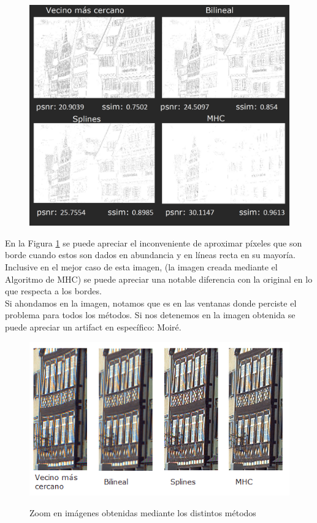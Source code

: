 \documentclass[a4paper]{article}
\begin{document}
\begin{figure}[h!]
    \caption{}
    \begin{center}
    \includegraphics[scale=0.40]{imagenes/comparacion/04/collage}
    \label{imagen4}
  \end{center}
\end{figure}

En la Figura \ref{imagen4} se puede apreciar el inconveniente de aproximar p\'ixeles que son borde cuando estos son dados en abundancia y en l\'ineas recta en su mayor\'ia. Inclusive en el mejor caso de esta imagen, (la imagen creada mediante el Algoritmo de MHC) se puede apreciar una notable diferencia con la original en lo que respecta a los bordes.\\

Si ahondamos en la imagen, notamos que es en las ventanas donde perciste el problema para todos los métodos. Si nos detenemos en la imagen obtenida se puede apreciar un artifact en específico: Moir\'e. \\

\begin{figure}[h!]
    \caption{Zoom en imágenes obtenidas mediante los distintos métodos}
    \begin{center}
    \includegraphics[scale=1]{imagenes/comparacion/04/ventanitas}
    \label{ventanitas}
  \end{center}
\end{figure}
\end{document}
